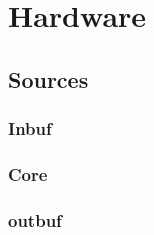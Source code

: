 \documentclass[11pt,technote,a4paper,twocolumn]{IEEEtran}
\begin{document}
\section{Hardware}
\label{sec:hardware}
\subsection{Sources}
\subsubsection{Inbuf}
\subsubsection{Core}
\subsubsection{outbuf}
\end{document}
